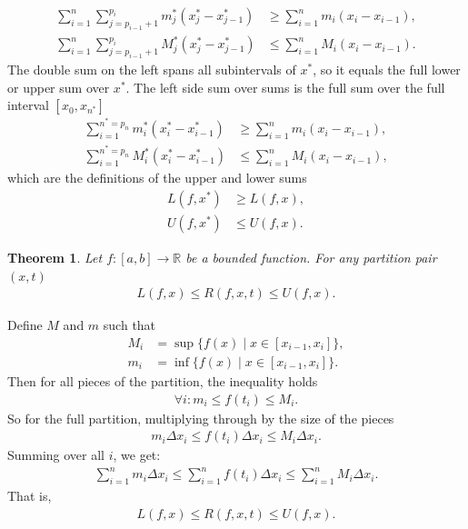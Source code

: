 \documentclass{amsart}
\numberwithin{equation}{section}
\let\oldendproof\endproof
\renewenvironment{proof}[1][\proofname]{%
  \setcounter{case}{0}
  \setcounter{step}{0}
  \oldproof[#1]%
}{\oldendproof}
\theoremstyle{plain}
\newtheorem{theorem}{Theorem}[section]
\theoremstyle{definition}
\theoremstyle{remark}
\begin{document}
\begin{proof}
  \begin{align*}
    \sum_{i=1}^n \sum_{j=p_{i-1}+1}^{p_i} m_j^* (x_j^* - x_{j-1}^*) &\geq \sum_{i=1}^n  m_i (x_i - x_{i-1}),\\
    \sum_{i=1}^n \sum_{j=p_{i-1}+1}^{p_i} M_j^* (x_j^* - x_{j-1}^*) &\leq\sum_{i=1}^n   M_i (x_i - x_{i-1}).
  \end{align*}
  The double sum on the left spans all subintervals of $x^*$, so it equals the full lower or upper sum over $x^*$.
  The left side sum over sums is the full sum over the full interval $[x_0, x_{n^*}]$
  \begin{align*}
    \sum_{i=1}^{n^*=p_n} m_i^* (x_i^* - x_{i-1}^*) &\geq \sum_{i=1}^n  m_i (x_i - x_{i-1}),\\
    \sum_{i=1}^{n^*=p_n} M_i^* (x_i^* - x_{i-1}^*) &\leq\sum_{i=1}^n   M_i (x_i - x_{i-1}),
  \end{align*}
  which are the definitions of the upper and lower sums
  \begin{align*}
    L(f, x^*) &\geq L(f, x),\\
    U(f, x^*) &\leq U(f, x).
  \end{align*}
\end{proof}

\begin{theorem}
  Let $f:[a, b] \to \mathbb{R}$ be a bounded function. For any partition pair $(x, t)$
  \begin{align*}
    L(f, x) \leq R(f, x, t) \leq U(f, x).
  \end{align*}
\end{theorem}
\begin{proof}
  Define $M$ and $m$ such that
  \begin{align*}
    M_i &= \sup \{ f(x) \mid x \in [x_{i-1}, x_i] \},\\
    m_i &= \inf \{ f(x) \mid x \in [x_{i-1}, x_i] \}.
  \end{align*}
  Then for all pieces of the partition, the inequality holds
  \begin{align*}
    \forall i: m_i  \leq f(t_i) \leq M_i.
  \end{align*}
  So for the full partition, multiplying through by the size of the pieces
  \begin{align*}
    m_i \Delta x_i \leq f(t_i) \Delta x_i \leq M_i \Delta x_i.  
  \end{align*}
  Summing over all \( i \), we get:
  \begin{align*}
    \sum_{i=1}^n m_i \Delta x_i \leq \sum_{i=1}^n f(t_i) \Delta x_i \leq \sum_{i=1}^n M_i \Delta x_i.
  \end{align*}
  That is,
  \begin{align*}
    L(f, x) \leq R(f, x, t) \leq U(f, x).
  \end{align*}
\end{proof}
\end{document}
